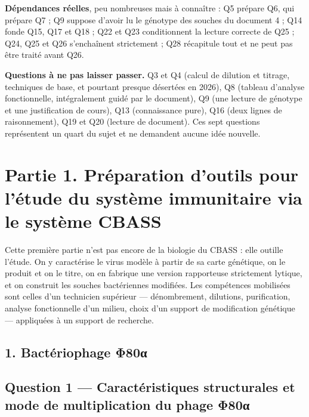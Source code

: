 \documentclass[11pt,a4paper]{article}
\begin{document}
\textbf{Dépendances réelles}, peu nombreuses mais à connaître : Q5 prépare Q6, qui prépare Q7 ; Q9 suppose d'avoir lu le génotype des souches du document 4 ; Q14 fonde Q15, Q17 et Q18 ; Q22 et Q23 conditionnent la lecture correcte de Q25 ; Q24, Q25 et Q26 s'enchaînent strictement ; Q28 récapitule tout et ne peut pas être traité avant Q26.

\textbf{Questions à ne pas laisser passer.} Q3 et Q4 (calcul de dilution et titrage, techniques de base, et pourtant presque désertées en 2026), Q8 (tableau d'analyse fonctionnelle, intégralement guidé par le document), Q9 (une lecture de génotype et une justification de cours), Q13 (connaissance pure), Q16 (deux lignes de raisonnement), Q19 et Q20 (lecture de document). Ces sept questions représentent un quart du sujet et ne demandent aucune idée nouvelle.

\hypertarget{partie-1.-pruxe9paration-doutils-pour-luxe9tude-du-systuxe8me-immunitaire-via-le-systuxe8me-cbass}{%
\section{Partie 1. Préparation d'outils pour l'étude du système immunitaire via le système CBASS}\label{partie-1.-pruxe9paration-doutils-pour-luxe9tude-du-systuxe8me-immunitaire-via-le-systuxe8me-cbass}}

Cette première partie n'est pas encore de la biologie du CBASS : elle outille l'étude. On y caractérise le virus modèle à partir de sa carte génétique, on le produit et on le titre, on en fabrique une version rapporteuse strictement lytique, et on construit les souches bactériennes modifiées. Les compétences mobilisées sont celles d'un technicien supérieur --- dénombrement, dilutions, purification, analyse fonctionnelle d'un milieu, choix d'un support de modification génétique --- appliquées à un support de recherche.

\hypertarget{bactuxe9riophage-ux3c680ux3b1}{%
\subsection{1. Bactériophage Φ80α}\label{bactuxe9riophage-ux3c680ux3b1}}

\hypertarget{question-1-caractuxe9ristiques-structurales-et-mode-de-multiplication-du-phage-ux3c680ux3b1}{%
\subsection{Question 1 --- Caractéristiques structurales et mode de multiplication du phage Φ80α}\label{question-1-caractuxe9ristiques-structurales-et-mode-de-multiplication-du-phage-ux3c680ux3b1}}
\end{document}
